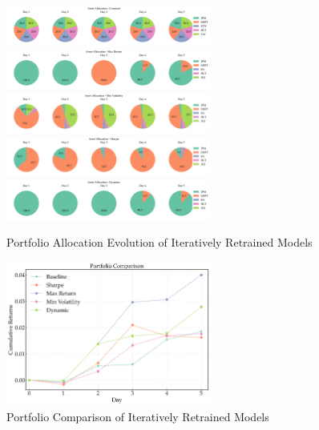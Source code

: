 \begin{figure}[htbp]
    \centering
    \includegraphics[width=0.6\textwidth]{figures/iterative/asset_allocations_constant.png}
    \includegraphics[width=0.6\textwidth]{figures/iterative/asset_allocations_max_return.png}
    \includegraphics[width=0.6\textwidth]{figures/iterative/asset_allocations_min_volatility.png}
    \includegraphics[width=0.6\textwidth]{figures/iterative/asset_allocations_sharpe.png}
    \includegraphics[width=0.6\textwidth]{figures/iterative/asset_allocations_dynamic.png}
    \caption{Portfolio Allocation Evolution of Iteratively Retrained Models}
    \label{fig:asset_allocations_evolution_iterative}
\end{figure}
\begin{figure}[htbp]
    \centering
    \includegraphics[width=0.6\textwidth]{figures/portfolio_comparison_final.png}
    \caption{Portfolio Comparison of Iteratively Retrained Models}
    \label{fig:portfolio_comparison_iterative}
\end{figure}


